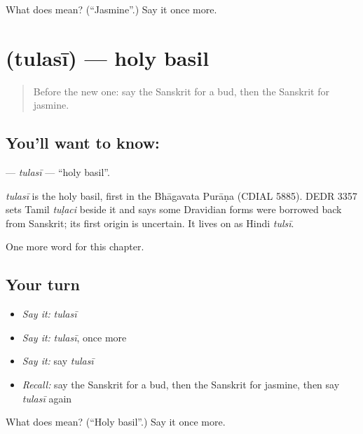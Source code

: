 \begin{tcolorbox}[breakable,colback=teal!4,colframe=teal!35!black,title={Before you move on}]
What does  mean? (\textquotedblleft{}Jasmine\textquotedblright{}.) Say it once more.
\end{tcolorbox}
\section[\texorpdfstring{\sk{तुलसी} (tulasī)}{तुलसी (tulasī)}]{ (tulasī) — holy basil}

\label{lesson:SA-C252-tulasi}



\begin{quote}
Before the new one: say the Sanskrit for a bud, then the Sanskrit for jasmine.
\end{quote}

\subsection*{You'll want to know: }
\textbf{} — \emph{tulasī} — \textquotedblleft{}holy basil\textquotedblright{}.

\begin{cousinweb}
\emph{tulasī} is the holy basil, first in the Bhāgavata Purāṇa (CDIAL 5885). DEDR 3357 sets Tamil \emph{tuḷaci} beside it and says some Dravidian forms were borrowed back from Sanskrit; its first origin is uncertain. It lives on as Hindi \emph{tulsī}.
\end{cousinweb}

\begin{grammarlens}[title={What you've built}]
One more word for this chapter.
\end{grammarlens}

\subsection*{Your turn}
\begin{itemize}
\raggedright
  \item \emph{Say it:} \emph{tulasī}
  \item \emph{Say it:} \emph{tulasī}, once more
  \item \emph{Say it:} say \emph{tulasī}
  \item \emph{Recall:} say the Sanskrit for a bud, then the Sanskrit for jasmine, then say \emph{tulasī} again
\end{itemize}

\begin{tcolorbox}[breakable,colback=teal!4,colframe=teal!35!black,title={Before you move on}]
What does  mean? (\textquotedblleft{}Holy basil\textquotedblright{}.) Say it once more.
\end{tcolorbox}
